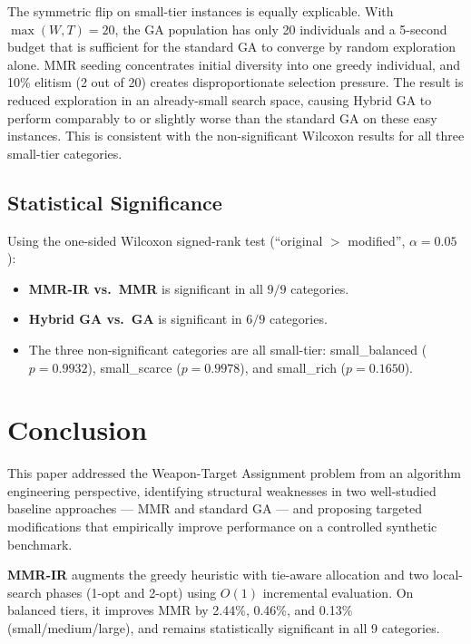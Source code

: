 \documentclass[10pt,conference]{IEEEtran}
\begin{document}
The symmetric flip on small-tier instances is equally explicable.
With $\max(W,T)=20$, the GA population has only 20 individuals and a
5-second budget that is sufficient for the standard GA to converge by
random exploration alone.
MMR seeding concentrates initial diversity into one greedy individual,
and 10\% elitism (2 out of 20) creates disproportionate selection pressure.
The result is reduced exploration in an already-small search space, causing
Hybrid GA to perform comparably to or slightly worse than the standard GA
on these easy instances.
This is consistent with the non-significant Wilcoxon results for all three
small-tier categories.

\subsection{Statistical Significance}

Using the one-sided Wilcoxon signed-rank test
(``original $>$ modified'', $\alpha = 0.05$):
\begin{itemize}
  \item \textbf{MMR-IR vs.\ MMR} is significant in all $9/9$ categories.
  \item \textbf{Hybrid GA vs.\ GA} is significant in $6/9$ categories.
  \item The three non-significant categories are all small-tier:
        small\_balanced ($p=0.9932$), small\_scarce ($p=0.9978$),
        and small\_rich ($p=0.1650$).
\end{itemize}

\section{Conclusion}
\label{sec:conclusion}

This paper addressed the Weapon-Target Assignment problem from an algorithm
engineering perspective, identifying structural weaknesses in two well-studied
baseline approaches — MMR and standard GA — and proposing targeted
modifications that empirically improve performance on a controlled synthetic
benchmark.

\textbf{MMR-IR} augments the greedy heuristic with tie-aware allocation and
two local-search phases (1-opt and 2-opt) using $O(1)$ incremental
evaluation.  On balanced tiers, it improves MMR by 2.44\%, 0.46\%, and
0.13\% (small/medium/large), and remains statistically significant in all
9 categories.
\end{document}
